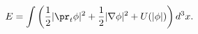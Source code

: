 \begin{equation}
E=\int \left( \frac{1}{2}|\pr_t{\phi}|^{2}+\frac{1}{2}|\nabla \phi
|^{2}+U(|\phi |)\right) d^{3}x.  \label{En}
\end{equation}%
